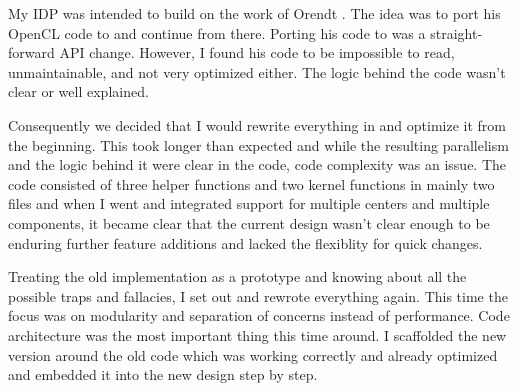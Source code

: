 My IDP was intended to build on the work of Orendt \TODO{}. The idea was to port his OpenCL code to \cuda{} and continue from there.
Porting his code to \cuda{} was a straight-forward API change. However, I found his code to be impossible to read, unmaintainable, and not very optimized either. The logic behind the code wasn't clear or well explained.


Consequently we decided that I would rewrite everything in \cuda{} and optimize it from the beginning. This took longer than expected and while the resulting parallelism and the logic behind it were clear in the code, code complexity was an issue. The code consisted of three helper functions and two kernel functions in mainly two files and when I went and integrated support for multiple centers and multiple components, it became clear that the current design wasn't clear enough to be enduring further feature additions and lacked the flexiblity for quick changes.


Treating the old implementation as a prototype and knowing about all the possible traps and fallacies, I set out and rewrote everything again. This time the focus was on modularity and separation of concerns instead of performance. Code architecture was the most important thing this time around. I scaffolded the new version around the old code which was working correctly and already optimized and embedded it into the new design step by step.